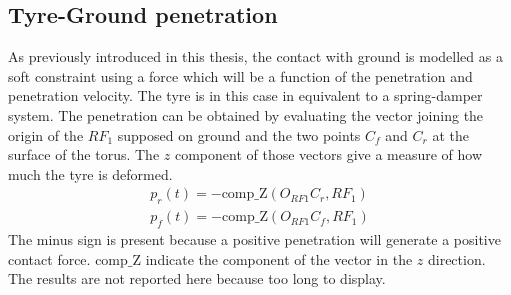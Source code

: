 \subsection{Tyre-Ground penetration}
%
As previously introduced in this thesis, the contact with ground is modelled as a soft constraint using a force which will be a function of the penetration and penetration velocity. The tyre is in this case in equivalent to a spring-damper system.\cite{sharp2004advances,leonelli2019optimal}
The penetration can be obtained by evaluating the vector joining the origin of the $RF_1$ supposed on ground and the two points $C_f$ and $C_r$ at the surface of the torus. The $z$ component of those vectors give a measure of how much the tyre is deformed.
%
\begin{equation}
    \label{eq:penetration}
    \begin{array}{l}
        p_r(t) = - \mathrm{comp\_Z}(O_{RF1}C_r,RF_1)\\
        p_f(t) = - \mathrm{comp\_Z}(O_{RF1}C_f,RF_1)
    \end{array}
\end{equation}
%
The minus sign is present because a positive penetration will generate a positive contact force.
$\mathrm{comp\_Z}$ indicate the component of the vector in the $z$ direction.
The results are not reported here because too long to display.
%
